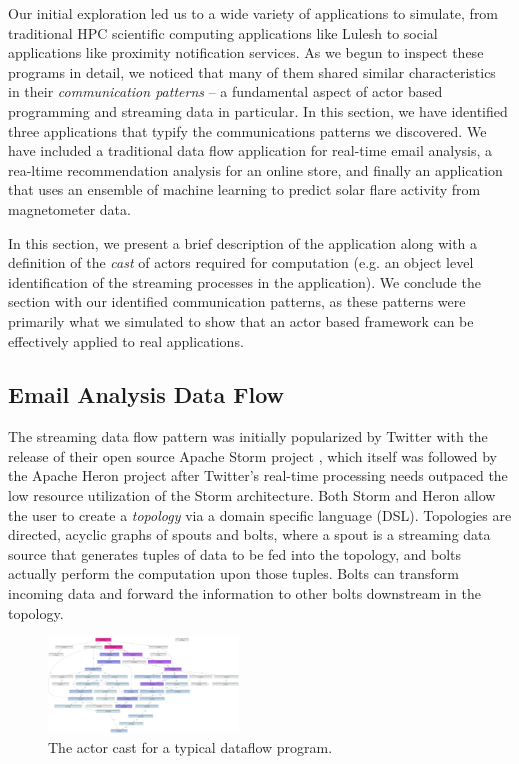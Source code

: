 \documentclass[conference,twocolumn,10pt]{IEEEtran}
\begin{document}
Our initial exploration led us to a wide variety of applications to simulate, from traditional HPC scientific computing applications like Lulesh to social applications like proximity notification services. As we begun to inspect these programs in detail, we noticed that many of them shared similar characteristics in their \textit{communication patterns} -- a fundamental aspect of actor based programming and streaming data in particular. In this section, we have identified three applications that typify the communications patterns we discovered. We have included a traditional data flow application for real-time email analysis, a rea-ltime recommendation analysis for an online store, and finally an application that uses an ensemble of machine learning to predict solar flare activity from magnetometer data.

In this section, we present a brief description of the application along with a definition of the \textit{cast} of actors required for computation (e.g. an object level identification of the streaming processes in the application). We conclude the section with our identified communication patterns, as these patterns were primarily what we simulated to show that an actor based framework can be effectively applied to real applications.

\subsection{Email Analysis Data Flow}

The streaming data flow pattern was initially popularized by Twitter with the release of their open source Apache Storm project \cite{toshniwal_storm_2014}, which itself was followed by the Apache Heron project \cite{kulkarni_twitter_2015} after Twitter's real-time processing needs outpaced the low resource utilization of the Storm architecture. Both Storm and Heron allow the user to create a \textit{topology} via a domain specific language (DSL). Topologies are directed, acyclic graphs of spouts and bolts, where a spout is a streaming data source that generates tuples of data to be fed into the topology, and bolts actually perform the computation upon those tuples. Bolts can transform incoming data and forward the information to other bolts downstream in the topology.

\begin{figure}[!h]
    \centering
    \includegraphics[width=0.45\textwidth]{dataflow_cast}
    \caption{The actor cast for a typical dataflow program.}
    \label{fig:dataflow_cast}
\end{figure}
\end{document}

